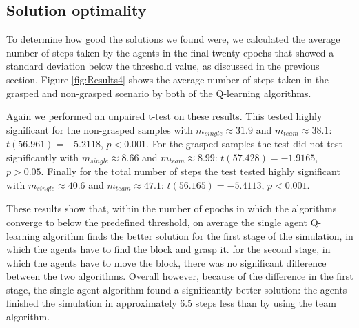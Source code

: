 \subsection{Solution optimality}
To determine how good the solutions we found were, we calculated the average number of steps taken by the agents in the final twenty epochs that showed a standard deviation below the threshold value, as discussed in the previous section. Figure \ref{fig:Results4} shows the average number of steps taken in the grasped and non-grasped scenario by both of the Q-learning algorithms.

Again we performed an unpaired t-test on these results. This tested highly significant for the non-grasped samples with $m_{single} \approx 31.9$ and $m_{team} \approx 38.1$: $t(56.961) = -5.2118$, $p < 0.001$. For the grasped samples the test did not test significantly with $m_{single} \approx 8.66$ and $m_{team} \approx 8.99$: $t(57.428) = -1.9165$, $p > 0.05$. Finally for the total number of steps the test tested highly significant with $m_{single} \approx 40.6$ and $m_{team} \approx 47.1$: $t(56.165) = -5.4113$, $p < 0.001$.

These results show that, within the number of epochs in which the algorithms converge to below the predefined threshold, on average the single agent Q-learning algorithm finds the better solution for the first stage of the simulation, in which the agents have to find the block and grasp it. for the second stage, in which the agents have to move the block, there was no significant difference between the two algorithms. Overall however, because of the difference in the first stage, the single agent algorithm found a significantly better solution: the agents finished the simulation in approximately 6.5 steps less than by using the team algorithm.

